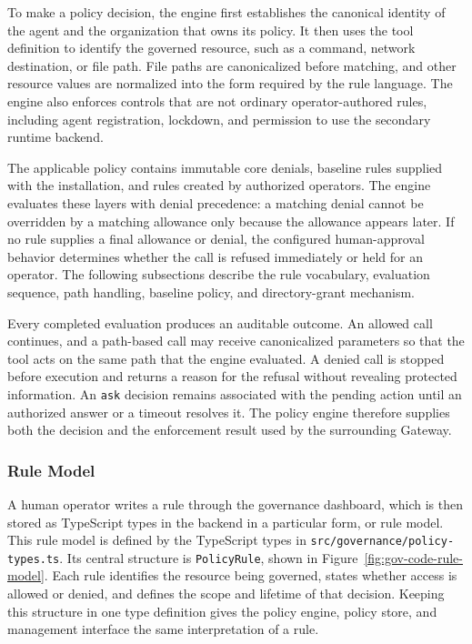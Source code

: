 To make a policy decision, the engine first
establishes the canonical identity of the agent and the organization that owns
its policy. It then uses the tool definition to identify the governed resource,
such as a command, network destination, or file path. File paths are
canonicalized before matching, and other resource values are normalized into
the form required by the rule language. The engine also enforces controls that
are not ordinary operator-authored rules, including agent registration,
lockdown, and permission to use the secondary runtime backend.

The applicable policy contains immutable core denials, baseline rules supplied
with the installation, and rules created by authorized operators. The engine
evaluates these layers with denial precedence: a matching denial cannot be
overridden by a matching allowance only because the allowance appears later.
If no rule supplies a final allowance or denial, the configured
human-approval behavior determines whether the call is refused immediately or
held for an operator. The following subsections describe the rule vocabulary,
evaluation sequence, path handling, baseline policy, and directory-grant
mechanism.

Every completed evaluation produces an auditable outcome. An allowed call
continues, and a path-based call may receive canonicalized parameters so that
the tool acts on the same path that the engine evaluated. A denied call is
stopped before execution and returns a reason for the refusal without
revealing protected information. An \texttt{ask} decision remains associated
with the pending action until an authorized answer or a timeout resolves it.
The policy engine therefore supplies both the decision and the enforcement
result used by the surrounding Gateway.

\subsubsection{Rule Model}

A human operator writes a rule through the governance dashboard, which is then stored as TypeScript types in the backend in a particular form, or rule model. This rule model is defined by the TypeScript types in
\texttt{src/governance/policy-types.ts}. Its central structure is
\texttt{PolicyRule}, shown in
Figure~\ref{fig:gov-code-rule-model}. Each rule identifies the resource being
governed, states whether access is allowed or denied, and defines the scope and
lifetime of that decision. Keeping this structure in one type definition gives
the policy engine, policy store, and management interface the same
interpretation of a rule.

